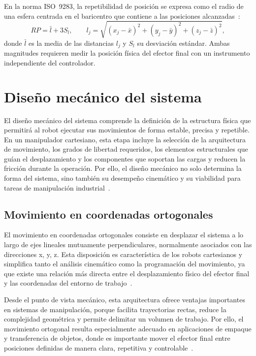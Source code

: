 En la norma ISO~9283, la repetibilidad de posición se expresa como el radio de una esfera centrada en el baricentro que contiene a las posiciones alcanzadas~\cite{iso9283}:
\begin{equation}
	RP = \bar{l} + 3S_l, \qquad
	l_j = \sqrt{(x_j-\bar{x})^2 + (y_j-\bar{y})^2 + (z_j-\bar{z})^2},
\end{equation}
donde $\bar{l}$ es la media de las distancias $l_j$ y $S_l$ su desviación estándar. Ambas magnitudes requieren medir la posición física del efector final con un instrumento independiente del controlador.


\section{Diseño mecánico del sistema}
El diseño mecánico del sistema comprende la definición de la estructura física que permitirá al robot ejecutar sus movimientos de forma estable, precisa y repetible. En un manipulador cartesiano, esta etapa incluye la selección de la arquitectura de movimiento, los grados de libertad requeridos, los elementos estructurales que guían el desplazamiento y los componentes que soportan las cargas y reducen la fricción durante la operación. Por ello, el diseño mecánico no solo determina la forma del sistema, sino también su desempeño cinemático y su viabilidad para tareas de manipulación industrial~\cite{lynch2017modern,siciliano2010robotics}.

\subsection{Movimiento en coordenadas ortogonales}
El movimiento en coordenadas ortogonales consiste en desplazar el sistema a lo largo de ejes lineales mutuamente perpendiculares, normalmente asociados con las direcciones x, y, z. Esta disposición es característica de los robots cartesianos y simplifica tanto el análisis cinemático como la programación del movimiento, ya que existe una relación más directa entre el desplazamiento físico del efector final y las coordenadas del entorno de trabajo~\cite{siciliano2010robotics,lynch2017modern}.

Desde el punto de vista mecánico, esta arquitectura ofrece ventajas importantes en sistemas de manipulación, porque facilita trayectorias rectas, reduce la complejidad geométrica y permite delimitar un volumen de trabajo. Por ello, el movimiento ortogonal resulta especialmente adecuado en aplicaciones de empaque y transferencia de objetos, donde es importante mover el efector final entre posiciones definidas de manera clara, repetitiva y controlable~\cite{siciliano2010robotics}.

